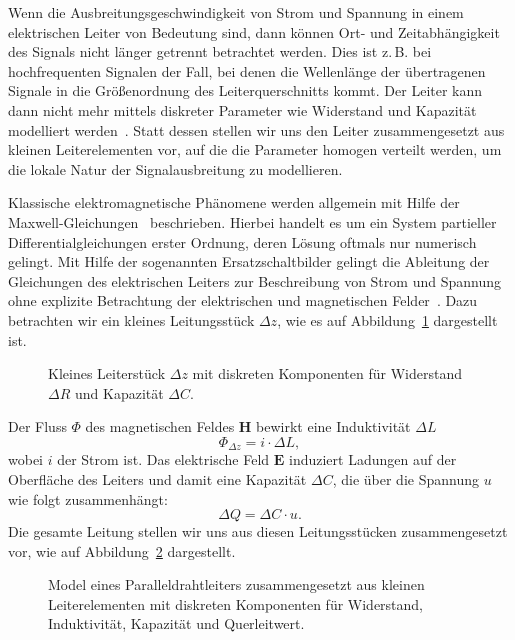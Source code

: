 \documentclass[paper=a4, parskip=half-, ngerman, fontsize=11pt]{scrreprt}
\begin{document}
Wenn die Ausbreitungsgeschwindigkeit von Strom und Spannung in einem elektrischen Leiter von Bedeutung sind, dann
können Ort- und Zeitabhängigkeit des Signals nicht länger getrennt betrachtet werden. Dies ist z.\,B. bei
hochfrequenten Signalen der Fall, bei denen die Wellenlänge der übertragenen Signale in die Größenordnung des
Leiterquerschnitts kommt. Der Leiter kann dann nicht mehr mittels diskreter Parameter wie Widerstand und Kapazität
modelliert werden~\cite{LeiterTheorie}. Statt dessen stellen wir uns den Leiter zusammengesetzt aus kleinen
Leiterelementen vor, auf die die Parameter homogen verteilt werden, um die lokale Natur der Signalausbreitung zu
modellieren.

Klassische elektromagnetische Phänomene werden allgemein mit Hilfe der Maxwell-Gleichungen~\cite{MaxwellGleichungen}
beschrieben. Hierbei handelt es um ein System partieller Differentialgleichungen erster Ordnung, deren Lösung oftmals
nur numerisch gelingt. Mit Hilfe der sogenannten Ersatzschaltbilder gelingt die Ableitung der Gleichungen des
elektrischen Leiters zur Beschreibung von Strom und Spannung ohne explizite Betrachtung der elektrischen und
magnetischen Felder~\cite{LeitungenUndFilter}. Dazu betrachten wir ein kleines Leitungsstück $\Delta z$, wie es auf
Abbildung~\ref{Leitung1} dargestellt ist.
\begin{figure}[!htb]
    \begin{center}
        
        \caption{Kleines Leiterstück $\Delta z$ mit diskreten Komponenten für Widerstand $\Delta R$ und
        Kapazität $\Delta C$.}
        \label{Leitung1}
    \end{center}
\end{figure}

Der Fluss $\Phi$ des magnetischen Feldes $\textbf{H}$ bewirkt eine Induktivität $\Delta L$
\[ \Phi_{\Delta z} = i \cdot \Delta L, \] wobei $i$ der Strom ist.
Das elektrische Feld $\textbf{E}$ induziert Ladungen auf der Oberfläche des Leiters und damit eine Kapazität $\Delta C$,
die über die Spannung $u$ wie folgt zusammenhängt:
\[ \Delta Q = \Delta C \cdot u . \]
Die gesamte Leitung stellen wir uns aus diesen Leitungsstücken zusammengesetzt vor, wie auf Abbildung~\ref{Leitung2}
dargestellt.
\begin{figure}[!htb]
    \begin{center}
        
        \caption{Model eines Paralleldrahtleiters zusammengesetzt aus kleinen Leiterelementen mit diskreten
        Komponenten für Widerstand, Induktivität, Kapazität und Querleitwert.}
        \label{Leitung2}
    \end{center}
\end{figure}
\end{document}
